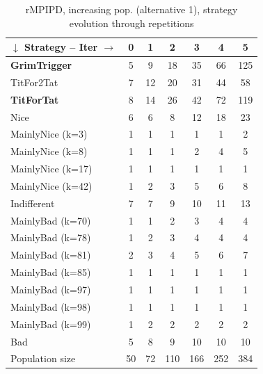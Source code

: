 \documentclass[journal,10pt,twoside]{IEEEtran}
\begin{document}
\begin{table}[ht]
    \caption{rMPIPD, increasing pop. (alternative 1), strategy evolution through repetitions}
    \label{tab:ripdmp-incr}
    \centering
    \begin{tabular}{l|cccccc} \toprule
        $\downarrow$ Strategy -- Iter $\rightarrow$ & 0 & 1 & 2 & 3 & 4 & 5 \\ \midrule
        \textbf{GrimTrigger} &  5 &   9 &  18 &  35 &  66 &  125 \\
        TitFor2Tat           &  7 &  12 &  20 &  31 &  44 &   58 \\
        \textbf{TitForTat}   &  8 &  14 &  26 &  42 &  72 &  119 \\
        Nice                 &  6 &   6 &   8 &  12 &  18 &   23 \\
        MainlyNice (k=3)     &  1 &   1 &   1 &   1 &   1 &    2 \\
        MainlyNice (k=8)     &  1 &   1 &   1 &   2 &   4 &    5 \\
        MainlyNice (k=17)    &  1 &   1 &   1 &   1 &   1 &    1 \\
        MainlyNice (k=42)    &  1 &   2 &   3 &   5 &   6 &    8 \\
        Indifferent          &  7 &   7 &   9 &  10 &  11 &   13 \\
        MainlyBad (k=70)     &  1 &   1 &   2 &   3 &   4 &    4 \\
        MainlyBad (k=78)     &  1 &   2 &   3 &   4 &   4 &    4 \\
        MainlyBad (k=81)     &  2 &   3 &   4 &   5 &   6 &    7 \\
        MainlyBad (k=85)     &  1 &   1 &   1 &   1 &   1 &    1 \\
        MainlyBad (k=97)     &  1 &   1 &   1 &   1 &   1 &    1 \\
        MainlyBad (k=98)     &  1 &   1 &   1 &   1 &   1 &    1 \\
        MainlyBad (k=99)     &  1 &   2 &   2 &   2 &   2 &    2 \\
        Bad                  &  5 &   8 &   9 &  10 &  10 &   10 \\ \midrule
        Population size      & 50 &  72 & 110 & 166 & 252 &  384 \\ \bottomrule
    \end{tabular}
\end{table}
\end{document}
